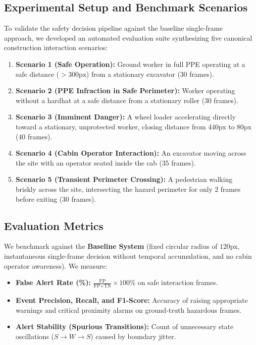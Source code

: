 \documentclass[letterpaper, 10 pt, conference]{ieeeconf}
\begin{document}
\subsection{Experimental Setup and Benchmark Scenarios}
To validate the safety decision pipeline against the baseline single-frame approach, we developed an automated evaluation suite synthesizing five canonical construction interaction scenarios:
\begin{enumerate}
    \item \textbf{Scenario 1 (Safe Operation):} Ground worker in full PPE operating at a safe distance ($>300\text{px}$) from a stationary excavator (30 frames).
    \item \textbf{Scenario 2 (PPE Infraction in Safe Perimeter):} Worker operating without a hardhat at a safe distance from a stationary roller (30 frames).
    \item \textbf{Scenario 3 (Imminent Danger):} A wheel loader accelerating directly toward a stationary, unprotected worker, closing distance from $440\text{px}$ to $80\text{px}$ (40 frames).
    \item \textbf{Scenario 4 (Cabin Operator Interaction):} An excavator moving across the site with an operator seated inside the cab (35 frames).
    \item \textbf{Scenario 5 (Transient Perimeter Crossing):} A pedestrian walking briskly across the site, intersecting the hazard perimeter for only 2 frames before exiting (30 frames).
\end{enumerate}

\subsection{Evaluation Metrics}
We benchmark against the \textbf{Baseline System} (fixed circular radius of $120\text{px}$, instantaneous single-frame decision without temporal accumulation, and no cabin operator awareness). We measure:
\begin{itemize}
    \item \textbf{False Alert Rate (\%):} $\frac{\text{FP}}{\text{FP} + \text{TN}} \times 100\%$ on safe interaction frames.
    \item \textbf{Event Precision, Recall, and F1-Score:} Accuracy of raising appropriate warnings and critical proximity alarms on ground-truth hazardous frames.
    \item \textbf{Alert Stability (Spurious Transitions):} Count of unnecessary state oscillations ($S \to W \to S$) caused by boundary jitter.
\end{itemize}
\end{document}
